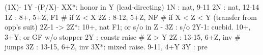 (1X)- 1Y -(P/X)- 
XX*: honor in Y (lead-directing)
1N : nat, 9-11
2N : nat, 12-14
1Z : 8+, 5+Z, F1
# if Z < X
2Z : 8-12, 5+Z, NF
# if X < Z < Y (transfer from opp's suit)
2Z-1 -> 2Z*: 10+, nat F1; or s/o in Z
     - 3Z : s/o
2Y-1: cuebid. 10+, 3+Y; or GF w/o stopper
2Y : constr raise
# Z > Y
2Z : 13-15, 6+Z, inv
# jumps
3Z : 13-15, 6+Z, inv
3X*: mixed raise. 9-11, 4+Y
3Y : pre